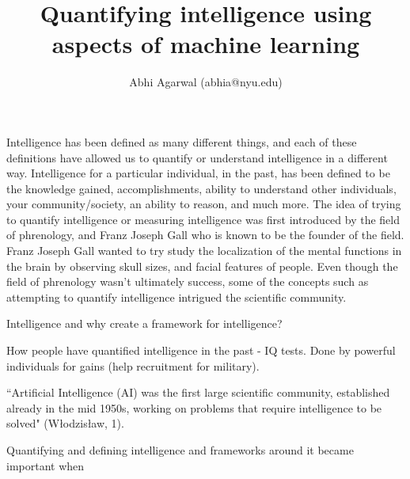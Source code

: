 \documentclass[11pt, oneside]{article}
\title{Quantifying intelligence using aspects of machine learning}
\author{Abhi Agarwal (abhia@nyu.edu)}
\date{}
\begin{document}
\maketitle

\par 


\par 
Intelligence has been defined as many different things, and each of these definitions have allowed us to quantify or understand intelligence in a different way. Intelligence for a particular individual, in the past, has been defined to be the knowledge gained, accomplishments, ability to understand other individuals, your community/society,  an ability to reason, and much more. 
The idea of trying to quantify intelligence or measuring intelligence was first introduced by the field of phrenology, and Franz Joseph Gall who is known to be the founder of the field. Franz Joseph Gall wanted to try study the localization of the mental functions in the brain by observing skull sizes, and facial features of people. Even though the field of phrenology wasn't ultimately success, some of the concepts such as attempting to quantify intelligence intrigued the scientific community. 

\par Intelligence and why create a framework for intelligence?


\par How people have quantified intelligence in the past - IQ tests. Done by powerful individuals for gains (help recruitment for military). 
\par ``Artificial Intelligence (AI) was the first large scientific community, established already in the mid 1950s, working on problems that require intelligence to be solved" (W\l{}odzis\l{}aw, 1).
\par Quantifying and defining intelligence and frameworks around it became important when 


\end{document}
